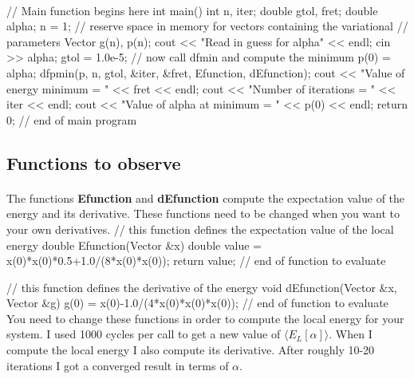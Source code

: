\documentclass[%
oneside,                 %
final,                   %
10pt]{article}
\begin{document}
\paragraph{}
\bcppcod
//   Main function begins here
int main()
{
     int n, iter;
     double gtol, fret;
     double alpha;
     n = 1;
//   reserve space in memory for vectors containing the variational
//   parameters
     Vector g(n), p(n);
     cout << "Read in guess for alpha" << endl;
     cin >> alpha;
     gtol = 1.0e-5;
//   now call dfmin and compute the minimum
     p(0) = alpha;
     dfpmin(p, n, gtol, &iter, &fret, Efunction, dEfunction);
     cout << "Value of energy minimum = " << fret << endl;
     cout << "Number of iterations = " << iter << endl;
     cout << "Value of alpha at minimum = " << p(0) << endl;
      return 0;
}  // end of main program

\ecppcod





\subsection{Functions to observe}

\paragraph{}
The functions \textbf{Efunction} and \textbf{dEfunction} compute the expectation value of the energy and its derivative.
These functions need to be changed when you want to your own derivatives.
\bcppcod
//  this function defines the expectation value of the local energy
double Efunction(Vector  &x)
{
  double value = x(0)*x(0)*0.5+1.0/(8*x(0)*x(0));
  return value;
} // end of function to evaluate

//  this function defines the derivative of the energy 
void dEfunction(Vector &x, Vector &g)
{
  g(0) = x(0)-1.0/(4*x(0)*x(0)*x(0));
} // end of function to evaluate
\ecppcod
You need to change these functions in order to compute the local energy for your system. I used 1000
cycles per call to get a new value of $\langle E_L[\alpha]\rangle$.
When I compute the local energy I also compute its derivative.
After roughly 10-20 iterations I got a converged result in terms of $\alpha$.




\end{document}
